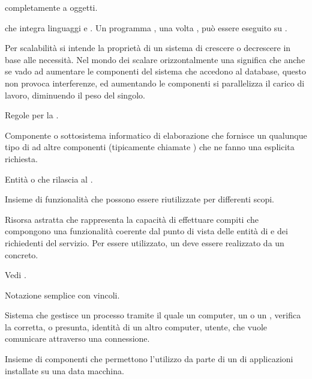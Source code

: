 { completamente a oggetti.}




{ che integra linguaggi  e . Un programma , una volta , può essere eseguito su .}

{Per scalabilità si intende la proprietà di un sistema di crescere o decrescere in base alle necessità. Nel mondo dei  scalare orizzontalmente una  significa che anche se vado ad aumentare le componenti del sistema che accedono al database, questo non provoca interferenze, ed aumentando le componenti si parallelizza il carico di lavoro, diminuendo il peso del singolo.}

{Regole per la .}

{Componente o sottosistema informatico di elaborazione che fornisce un qualunque tipo di  ad altre componenti (tipicamente chiamate ) che ne fanno una esplicita richiesta.}

{Entità  o  che rilascia  al .}

{Insieme di funzionalità  che possono essere riutilizzate per differenti scopi.}

{Risorsa astratta che rappresenta la capacità di effettuare compiti che compongono una funzionalità coerente dal punto di vista delle entità di  e dei richiedenti del servizio. Per essere utilizzato, un  deve essere realizzato da un  concreto.}

{Vedi .}

{Notazione semplice con vincoli.}

{Sistema che gestisce un processo tramite il quale un computer, un  o un , verifica la corretta, o presunta, identità di un altro computer, utente, che vuole comunicare attraverso una connessione.}

{Insieme di componenti  che permettono l'utilizzo da parte di un  di applicazioni installate su una data macchina.}

